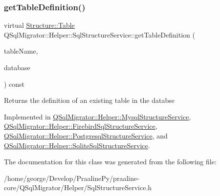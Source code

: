 \mbox{\label{class_q_sql_migrator_1_1_helper_1_1_sql_structure_service_abb2f11402700c1a1e52d596431255e8a}} 
\subsubsection{\texorpdfstring{get\+Table\+Definition()}{getTableDefinition()}}
{\footnotesize\ttfamily virtual \hyperlink{class_q_sql_migrator_1_1_structure_1_1_table}{Structure\+::\+Table} Q\+Sql\+Migrator\+::\+Helper\+::\+Sql\+Structure\+Service\+::get\+Table\+Definition (\begin{DoxyParamCaption}\item[{const Q\+String \&}]{table\+Name,  }\item[{Q\+Sql\+Database}]{database }\end{DoxyParamCaption}) const\hspace{0.3cm}{\ttfamily [pure virtual]}}

\begin{DoxyReturn}{Returns}
the definition of an existing table in the databse 
\end{DoxyReturn}


Implemented in \hyperlink{class_q_sql_migrator_1_1_helper_1_1_mysql_structure_service_a67d203e233e158e2a57bfe1b417c549f}{Q\+Sql\+Migrator\+::\+Helper\+::\+Mysql\+Structure\+Service}, \hyperlink{class_q_sql_migrator_1_1_helper_1_1_firebird_sql_structure_service_aface10de417ab9e0e749cfe2f53728e6}{Q\+Sql\+Migrator\+::\+Helper\+::\+Firebird\+Sql\+Structure\+Service}, \hyperlink{class_q_sql_migrator_1_1_helper_1_1_postgresql_structure_service_a6a6f23dd54be7f27f0fa798c65512746}{Q\+Sql\+Migrator\+::\+Helper\+::\+Postgresql\+Structure\+Service}, and \hyperlink{class_q_sql_migrator_1_1_helper_1_1_sqlite_sql_structure_service_a39ea75353d9471ae6ebffd36865dd52a}{Q\+Sql\+Migrator\+::\+Helper\+::\+Sqlite\+Sql\+Structure\+Service}.



The documentation for this class was generated from the following file\+:\begin{DoxyCompactItemize}
\item 
/home/george/\+Develop/\+Praaline\+Py/praaline-\/core/\+Q\+Sql\+Migrator/\+Helper/Sql\+Structure\+Service.\+h\end{DoxyCompactItemize}
